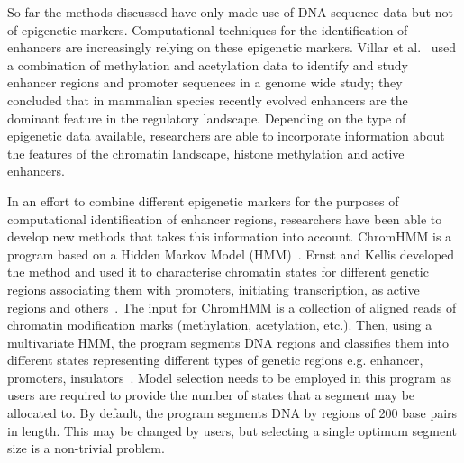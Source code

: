         

        

        So far the methods discussed have only made use of DNA sequence data but not of epigenetic markers. 
        Computational techniques for the identification of enhancers are increasingly relying on these epigenetic markers. Villar et al.~\cite{villar2015enhancer} used a combination of methylation and acetylation data to identify and study enhancer regions and promoter sequences in a genome wide study; they concluded that in mammalian species recently evolved enhancers are the dominant feature in the regulatory landscape. Depending on the type of epigenetic data available, researchers are able to incorporate information about the features of the chromatin landscape, histone methylation and active enhancers. 
        
        In an effort to combine different epigenetic markers for the purposes of computational identification of enhancer regions, researchers have been able to develop new methods that takes this information into account. ChromHMM is a program based on a Hidden Markov Model (HMM)~\cite{mesa2016hidden}. Ernst and Kellis developed the method and used it to characterise chromatin states for different genetic regions associating them with promoters, initiating transcription, as active regions and others~\cite{ernst2010discovery}. The input for ChromHMM is a collection of aligned reads of chromatin modification marks (methylation, acetylation, etc.). Then, using a multivariate HMM, the program segments DNA regions and classifies them into different states representing different types of genetic regions e.g. enhancer, promoters, insulators~\cite{ernst2012chromhmm}. Model selection needs to be employed in this program as users are required to provide the number of states that a segment may be allocated to. By default, the program segments DNA by regions of 200 base pairs in length. This may be changed by users, but selecting a single optimum segment size is a non-trivial problem. 
        
